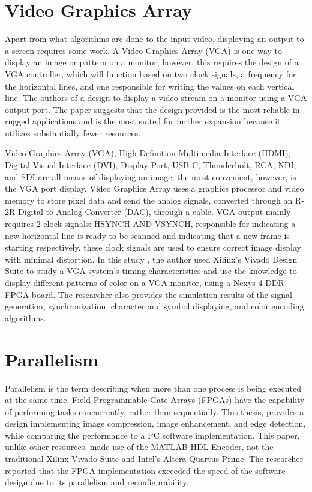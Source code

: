 \section{Video Graphics Array}
\par	Apart from what algorithms are done to the input video, displaying an output to a screen requires some work. A Video Graphics Array (VGA) is one way to display an image or pattern on a monitor; however, this requires the design of a VGA controller, which will function based on two clock signals, a frequency for the horizontal lines, and one responsible for writing the values on each vertical line. The authors of \cite{five} a design to display a video stream on a monitor using a VGA output port. The paper suggests that the design provided is the most reliable in rugged applications and is the most suited for further expansion because it utilizes substantially fewer resources. \newline
\par	Video Graphics Array (VGA), High-Definition Multimedia Interface (HDMI), Digital Visual Interface (DVI), Display Port, USB-C, Thunderbolt, RCA, NDI, and SDI are all means of displaying an image; the most convenient, however, is the VGA port display. Video Graphics Array uses a graphics processor and video memory to store pixel data and send the analog signals, converted through an R-2R Digital to Analog Converter (DAC), through a cable. VGA output mainly requires 2 clock signals: HSYNCH AND VSYNCH, responsible for indicating a new horizontal line is ready to be scanned and indicating that a new frame is starting respectively, these clock signals are used to ensure correct image display with minimal distortion. In this study \cite{twenty_three}, the author used Xilinx’s Vivado Design Suite to study a VGA system’s timing characteristics and use the knowledge to display different patterns of color on a VGA monitor, using a Nexys-4 DDR FPGA board. The researcher also provides the simulation results of the signal generation, synchronization, character and symbol displaying, and color encoding algorithms. \newline

\section{Parallelism}
\par	Parallelism is the term describing when more than one process is being executed at the same time. Field Programmable Gate Arrays (FPGAs) have the capability of performing tasks concurrently, rather than sequentially. This thesis, \cite{seventeen} provides a design implementing image compression, image enhancement, and edge detection, while comparing the performance to a PC software implementation. This paper, unlike other resources, made use of the MATLAB HDL Encoder, not the traditional Xilinx Vivado Suite and Intel’s Altera Quartus Prime. The researcher reported that the FPGA implementation exceeded the speed of the software design due to its parallelism and reconfigurability. \newline

